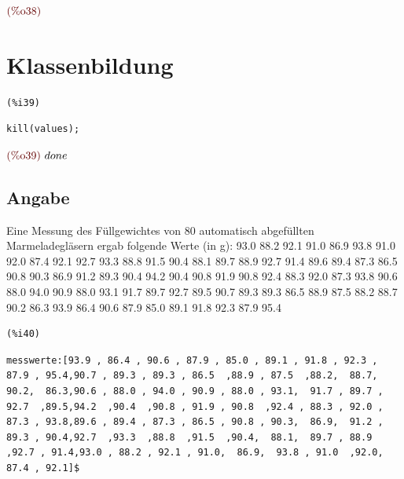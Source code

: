\documentclass{article}
\begin{document}
\begin{math}\displaystyle
\parbox{8ex}{\color{labelcolor}(\%o38) }

\end{math}


\section{Klassenbildung}



\noindent
\begin{minipage}[t]{8ex}{\color{red}\bf
\begin{verbatim}
(%i39) 
\end{verbatim}}
\end{minipage}
\begin{minipage}[t]{\textwidth}{\color{blue}
\begin{verbatim}
kill(values);
\end{verbatim}}
\end{minipage}
\begin{math}\displaystyle
\parbox{8ex}{\color{labelcolor}(\%o39) }
done
\end{math}


\subsection{Angabe}


Eine Messung des Füllgewichtes von 80 automatisch abgefüllten Marmeladegläsern ergab folgende Werte (in g):
93.0  88.2  92.1  91.0  86.9  93.8  91.0  92.0  87.4  92.1
92.7  93.3  88.8  91.5  90.4  88.1  89.7  88.9  92.7  91.4
89.6  89.4  87.3  86.5  90.8  90.3  86.9  91.2  89.3  90.4
94.2  90.4  90.8  91.9  90.8  92.4  88.3  92.0  87.3  93.8
90.6  88.0  94.0  90.9  88.0  93.1  91.7  89.7  92.7  89.5
90.7  89.3  89.3  86.5  88.9  87.5  88.2  88.7  90.2  86.3
93.9  86.4  90.6  87.9  85.0  89.1  91.8  92.3  87.9  95.4

\noindent
\begin{minipage}[t]{8ex}{\color{red}\bf
\begin{verbatim}
(%i40) 
\end{verbatim}}
\end{minipage}
\begin{minipage}[t]{\textwidth}{\color{blue}
\begin{verbatim}
messwerte:[93.9 , 86.4 , 90.6 , 87.9 , 85.0 , 89.1 , 91.8 , 92.3 , 87.9 , 95.4,90.7 , 89.3 , 89.3 , 86.5  ,88.9 , 87.5  ,88.2,  88.7,  90.2,  86.3,90.6 , 88.0 , 94.0 , 90.9 , 88.0 , 93.1,  91.7 , 89.7 , 92.7  ,89.5,94.2  ,90.4  ,90.8 , 91.9 , 90.8  ,92.4 , 88.3 , 92.0 , 87.3 , 93.8,89.6 , 89.4 , 87.3 , 86.5 , 90.8 , 90.3,  86.9,  91.2 , 89.3 , 90.4,92.7  ,93.3  ,88.8  ,91.5  ,90.4,  88.1,  89.7 , 88.9  ,92.7 , 91.4,93.0 , 88.2 , 92.1 , 91.0,  86.9,  93.8 , 91.0  ,92.0,  87.4 , 92.1]$
\end{verbatim}}
\end{minipage}
\end{document}
